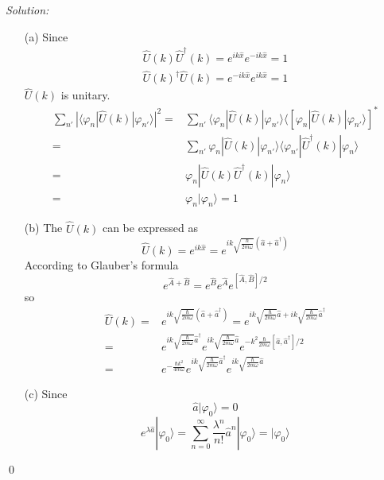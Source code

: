 \documentclass[12pt,a4paper]{article}
\newenvironment{sol}
    {\emph{Solution:}
    }
    {
    \qed
    }
\begin{document}
\begin{sol}
\begin{itemize}
\item[(a)] Since
\begin{gather}
\hat{U}(k)\hat{U}^{\dagger}(k)=e^{ik\hat{x}}e^{-ik\hat{x}}=1\\
\hat{U}(k)^{\dagger}\hat{U}(k)=e^{-ik\hat{x}}e^{ik\hat{x}}=1
\end{gather}
$\hat{U}(k)$ is unitary.\\
\begin{align}
\nonumber\sum_{n'}|\langle\varphi_n|\hat{U}(k)|\varphi_{n'}\rangle|^2=&\sum_{n'}\langle\varphi_n|\hat{U}(k)|\varphi_{n'}\rangle\langle[\varphi_n|\hat{U}(k)|\varphi_{n'}\rangle]^*\\
\nonumber=&\sum_{n'}\varphi_n|\hat{U}(k)|\varphi_{n'}\rangle\langle\varphi_{n'}|\hat{U}^{\dagger}(k)|\varphi_n\rangle\\
\nonumber=&\varphi_n|\hat{U}(k)\hat{U}^{\dagger}(k)|\varphi_n\rangle\\
=&\varphi_n|\varphi_n\rangle=1
\end{align}
\item[(b)] The $\hat{U}(k)$ can be expressed as
\begin{equation}
\hat{U}(k)=e^{ik\hat{x}}=e^{ik\sqrt{\frac{\hbar}{2m\omega}}(\hat{a}+\hat{a}^{\dagger})}
\end{equation}
According to Glauber's formula
\begin{equation}
e^{\hat{A}+\hat{B}}=e^{\hat{B}}e^{\hat{A}}e^{[\hat{A},\hat{B}]/2}
\end{equation}
so
\begin{align}
\nonumber\hat{U}(k)=&e^{ik\sqrt{\frac{\hbar}{2m\omega}}(\hat{a}+\hat{a}^{\dagger})}=e^{ik\sqrt{\frac{\hbar}{2m\omega}}\hat{a}+ik\sqrt{\frac{\hbar}{2m\omega}}\hat{a}^{\dagger}}\\
\nonumber=&e^{ik\sqrt{\frac{\hbar}{2m\omega}}\hat{a}^{\dagger}}e^{ik\sqrt{\frac{\hbar}{2m\omega}}\hat{a}}e^{-k^2\frac{\hbar}{2m\omega}[\hat{a},\hat{a}^{\dagger}]/2}\\
=&e^{-\frac{\hbar k^2}{4m\omega}}e^{ik\sqrt{\frac{\hbar}{2m\omega}}\hat{a}^{\dagger}}e^{ik\sqrt{\frac{\hbar}{2m\omega}}\hat{a}}
\end{align}
\item[(c)] Since
\begin{equation}
\hat{a}|\varphi_0\rangle=0
\end{equation}
\begin{equation}
e^{\lambda\hat{a}}|\varphi_0\rangle=\sum_{n=0}^{\infty}\frac{\lambda^n}{n!}\hat{a}^n|\varphi_0\rangle=|\varphi_0\rangle

\end{equation}
\end{itemize}
\end{sol}
\end{document}
